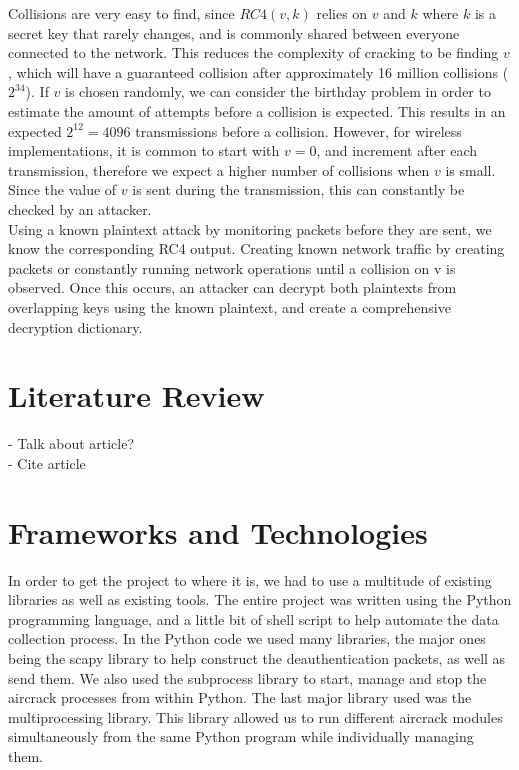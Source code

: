 \documentclass[10pt, titlepage]{article}
\begin{document}
Collisions are very easy to find, since $RC4(v,k)$ relies on $v$ and $k$ where $k$ is a secret key that rarely changes, and is commonly shared between everyone connected to the network. This reduces the complexity of cracking to be finding $v$, which will have a guaranteed collision after approximately 16 million collisions ($2^34$). If $v$ is chosen randomly, we can consider the birthday problem in order to estimate the amount of attempts before a collision is expected. This results in an expected $2^12 = 4096$ transmissions before a collision. However, for wireless implementations, it is common to start with $v= 0$, and increment after each transmission, therefore we expect a higher number of collisions when $v$ is small. Since the value of $v$ is sent during the transmission, this can constantly be checked by an attacker. \\

Using a known plaintext attack by monitoring packets before they are sent, we know the corresponding RC4 output. Creating known network traffic by creating packets or constantly running network operations until a collision on v is observed. Once this occurs, an attacker can decrypt both plaintexts from overlapping keys using the known plaintext, and create a comprehensive decryption dictionary. \\



\section{Literature Review}
 - Talk about article?\\
 - Cite article\\

\section{Frameworks and Technologies}
In order to get the project to where it is, we had to use a multitude of existing libraries as well as existing tools. The entire project was written using the Python programming language, and a little bit of shell script to help automate the data collection process. In the Python code we used many libraries, the major ones being the scapy library to help construct the deauthentication packets, as well as send them. We also used the subprocess library to start, manage and stop the aircrack processes from within Python. The last major library used was the multiprocessing library. This library allowed us to run different aircrack modules simultaneously from the same Python program while individually managing them. \\
\end{document}
